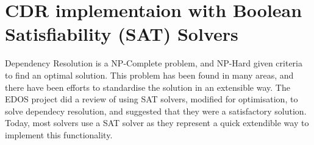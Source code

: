 







\section{CDR implementaion with Boolean Satisfiability (SAT) Solvers}
\label{impl.SAT}


Dependency Resolution is a NP-Complete problem, and NP-Hard given criteria to find an optimal solution.
This problem has been found in many areas, and there have been efforts to standardise the solution in an extensible way.
The EDOS project did a review of using SAT solvers, modified for optimisation, to solve dependecy resolution, and suggested that they were a satisfactory solution.
Today, most solvers use a SAT solver as they represent a quick extendible way to implement this functionality.




